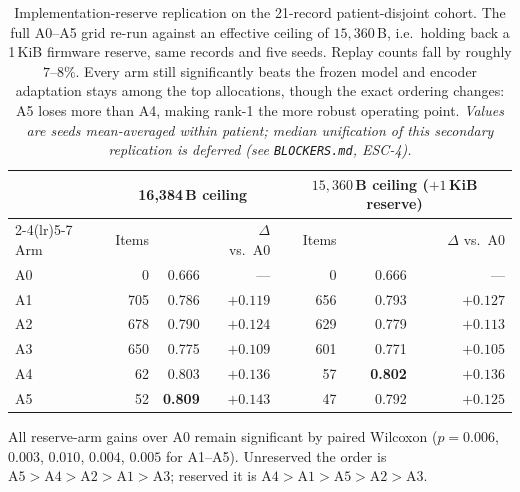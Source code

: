 \begin{table}[H]
\centering
\small
\caption{Implementation-reserve replication on the 21-record patient-disjoint
cohort. The full A0--A5 grid re-run against an effective ceiling of
$15{,}360$\,B, i.e.\ holding back a 1\,KiB firmware reserve, same records and
five seeds. Replay counts fall by roughly $7$--$8\%$. Every arm still
significantly beats the frozen model and encoder adaptation stays among the top
allocations, though the exact ordering changes: A5 loses more than A4, making
rank-1 the more robust operating point. \emph{Values are seeds mean-averaged
within patient; median unification of this secondary replication is deferred
(see \texttt{BLOCKERS.md}, ESC-4).}}
\label{tab:reserve}
\setlength{\tabcolsep}{5pt}
\begin{tabular}{lrrrrrr}
\toprule
& \multicolumn{3}{c}{16{,}384\,B ceiling} & \multicolumn{3}{c}{$15{,}360$\,B ceiling ($+1$\,KiB reserve)} \\
\cmidrule(lr){2-4}\cmidrule(lr){5-7}
Arm & Items & \macrof{} & $\Delta$ vs.\ A0 & Items & \macrof{} & $\Delta$ vs.\ A0 \\
\midrule
A0 & 0   & 0.666 & ---      & 0   & 0.666 & --- \\
A1 & 705 & 0.786 & $+0.119$ & 656 & 0.793 & $+0.127$ \\
A2 & 678 & 0.790 & $+0.124$ & 629 & 0.779 & $+0.113$ \\
A3 & 650 & 0.775 & $+0.109$ & 601 & 0.771 & $+0.105$ \\
A4 & 62  & 0.803 & $+0.136$ & 57  & \textbf{0.802} & $\mathbf{+0.136}$ \\
A5 & 52  & \textbf{0.809} & $\mathbf{+0.143}$ & 47 & 0.792 & $+0.125$ \\
\bottomrule
\end{tabular}

\vspace{0.4em}
{\small All reserve-arm gains over A0 remain significant by paired Wilcoxon
($p = 0.006$, $0.003$, $0.010$, $0.004$, $0.005$ for A1--A5). Unreserved the
order is $\mathrm{A5}>\mathrm{A4}>\mathrm{A2}>\mathrm{A1}>\mathrm{A3}$; reserved
it is $\mathrm{A4}>\mathrm{A1}>\mathrm{A5}>\mathrm{A2}>\mathrm{A3}$.}
\end{table}
